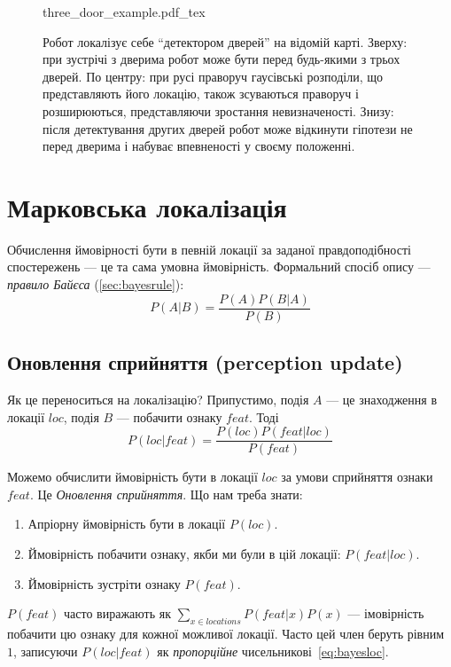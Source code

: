 \begin{figure}
    \centering
    \def\svgwidth{\textwidth}
    {three_door_example.pdf_tex}
    \caption{Робот локалізує себе ``детектором дверей'' на відомій карті. Зверху: при зустрічі з дверима робот може бути перед будь-якими з трьох дверей. По центру: при русі праворуч гаусівські розподіли, що представляють його локацію, також зсуваються праворуч і розширюються, представляючи зростання невизначеності. Знизу: після детектування других дверей робот може відкинути гіпотези не перед дверима і набуває впевненості у своєму положенні. \label{fig:three_door_example}}
\end{figure}

\section{Марковська локалізація}\label{sec:markovloc}
Обчислення ймовірності бути в певній локації за заданої правдоподібності спостережень — це та сама умовна ймовірність. Формальний спосіб опису — \emph{правило Байєса} (\cref{sec:bayesrule}):
\begin{equation}
P(A|B)=\frac{P(A)P(B|A)}{P(B)}
\end{equation}

\subsection{Оновлення сприйняття (perception update)}
Як це переноситься на локалізацію? Припустимо, подія $A$ — це знаходження в локації $loc$, подія $B$ — побачити ознаку $feat$. Тоді
\begin{equation}
P(loc|feat)=\frac{P(loc)P(feat|loc)}{P(feat)}
\label{eq:bayesloc}
\end{equation}

Можемо обчислити ймовірність бути в локації $loc$ за умови сприйняття ознаки $feat$. Це \emph{Оновлення сприйняття}. Що нам треба знати:
\begin{enumerate}
\item Апріорну ймовірність бути в локації $P(loc)$.
\item Ймовірність побачити ознаку, якби ми були в цій локації: $P(feat|loc)$.
\item Ймовірність зустріти ознаку $P(feat)$.
\end{enumerate}
$P(feat)$ часто виражають як $\sum_{x\in locations}P(feat|x)P(x)$ — імовірність побачити цю ознаку для кожної можливої локації. Часто цей член беруть рівним $1$, записуючи $P(loc|feat)$ як \emph{пропорційне} чисельникові~\eqref{eq:bayesloc}.

